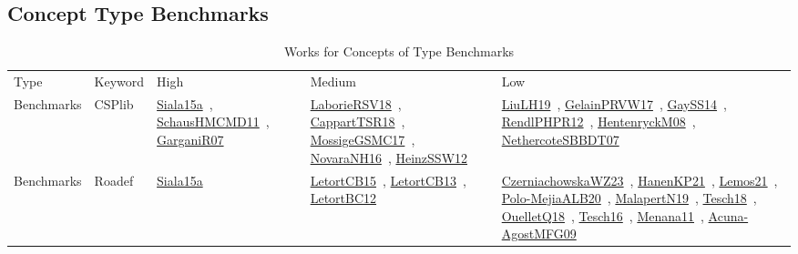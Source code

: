 \clearpage
\subsection{Concept Type Benchmarks}
\label{sec:Benchmarks}
{\scriptsize
\begin{longtable}{lp{3cm}>{\raggedright\arraybackslash}p{6cm}>{\raggedright\arraybackslash}p{6cm}>{\raggedright\arraybackslash}p{8cm}}
\rowcolor{white}\caption{Works for Concepts of Type Benchmarks}\\ \toprule
\rowcolor{white}Type & Keyword & High & Medium & Low\\ \midrule\endhead
\bottomrule
\endfoot
Benchmarks & CSPlib & \href{works/Siala15a.pdf}{Siala15a}~\cite{Siala15a}, \href{works/SchausHMCMD11.pdf}{SchausHMCMD11}~\cite{SchausHMCMD11}, \href{works/GarganiR07.pdf}{GarganiR07}~\cite{GarganiR07} & \href{works/LaborieRSV18.pdf}{LaborieRSV18}~\cite{LaborieRSV18}, \href{works/CappartTSR18.pdf}{CappartTSR18}~\cite{CappartTSR18}, \href{works/MossigeGSMC17.pdf}{MossigeGSMC17}~\cite{MossigeGSMC17}, \href{works/NovaraNH16.pdf}{NovaraNH16}~\cite{NovaraNH16}, \href{works/HeinzSSW12.pdf}{HeinzSSW12}~\cite{HeinzSSW12} & \href{works/LiuLH19.pdf}{LiuLH19}~\cite{LiuLH19}, \href{works/GelainPRVW17.pdf}{GelainPRVW17}~\cite{GelainPRVW17}, \href{works/GaySS14.pdf}{GaySS14}~\cite{GaySS14}, \href{works/RendlPHPR12.pdf}{RendlPHPR12}~\cite{RendlPHPR12}, \href{works/HentenryckM08.pdf}{HentenryckM08}~\cite{HentenryckM08}, \href{works/NethercoteSBBDT07.pdf}{NethercoteSBBDT07}~\cite{NethercoteSBBDT07}\\
Benchmarks & Roadef & \href{works/Siala15a.pdf}{Siala15a}~\cite{Siala15a} & \href{works/LetortCB15.pdf}{LetortCB15}~\cite{LetortCB15}, \href{works/LetortCB13.pdf}{LetortCB13}~\cite{LetortCB13}, \href{works/LetortBC12.pdf}{LetortBC12}~\cite{LetortBC12} & \href{works/CzerniachowskaWZ23.pdf}{CzerniachowskaWZ23}~\cite{CzerniachowskaWZ23}, \href{works/HanenKP21.pdf}{HanenKP21}~\cite{HanenKP21}, \href{works/Lemos21.pdf}{Lemos21}~\cite{Lemos21}, \href{works/Polo-MejiaALB20.pdf}{Polo-MejiaALB20}~\cite{Polo-MejiaALB20}, \href{works/MalapertN19.pdf}{MalapertN19}~\cite{MalapertN19}, \href{works/Tesch18.pdf}{Tesch18}~\cite{Tesch18}, \href{works/OuelletQ18.pdf}{OuelletQ18}~\cite{OuelletQ18}, \href{works/Tesch16.pdf}{Tesch16}~\cite{Tesch16}, \href{works/Menana11.pdf}{Menana11}~\cite{Menana11}, \href{works/Acuna-AgostMFG09.pdf}{Acuna-AgostMFG09}~\cite{Acuna-AgostMFG09}\\

\end{longtable}}
